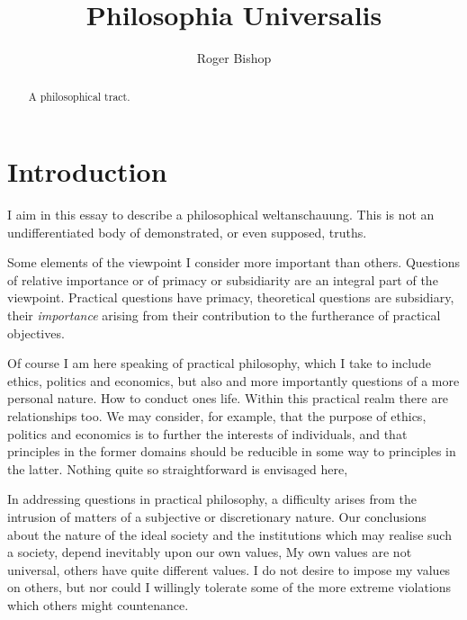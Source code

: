 \documentclass{rbjk}
\begin{document}
                                                                                   
\begin{article}
\begin{opening}  
\title{Philosophia Universalis}
\author{Roger Bishop }

\begin{abstract}
A philosophical tract.
\end{abstract}
\end{opening}

\setcounter{tocdepth}{4}
{\parskip-0pt\tableofcontents}

\section{Introduction}

I aim in this essay to describe a philosophical weltanschauung.
This is not an undifferentiated body of demonstrated, or even supposed, truths.

Some elements of the viewpoint I consider more important than others.
Questions of relative importance or of primacy or subsidiarity are an integral part of the viewpoint.
Practical questions have primacy, theoretical questions are subsidiary, their {\it importance} arising from their contribution to the furtherance of practical objectives. 

Of course I am here speaking of practical philosophy, which I take to include ethics, politics and economics, but also and more importantly questions of a more personal nature.
How to conduct ones life.
Within this practical realm there are relationships too.
We may consider, for example, that the purpose of ethics, politics and economics is to further the interests of individuals, and that principles in the former domains should be reducible in some way to principles in the latter.
Nothing quite so straightforward is envisaged here,

In addressing questions in practical philosophy, a difficulty arises from the intrusion of matters of a subjective or discretionary nature.
Our conclusions about the nature of the ideal society and the institutions which may realise such a society, depend inevitably upon our own values,
My own values are not universal, others have quite different values.
I do not desire to impose my values on others, but nor could I willingly tolerate some of the more extreme violations which others might countenance.


\end{article}
\end{document}
